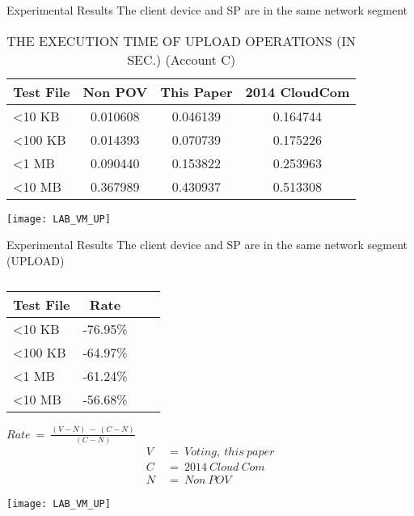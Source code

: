 \begin{frame}{Experimental Results}
{The client device and SP are in the same network segment}
	\scriptsize
    \begin{table}[]
    \centering
    \caption{THE EXECUTION TIME OF \alert{UPLOAD} OPERATIONS (IN SEC.) (Account C)}
    \begin{tabular}{lccc}
        Test File        & Non POV  & This Paper & 2014 CloudCom \\ \hline
        \textless 10 KB  & 0.010608 & 0.046139   & 0.164744      \\ \hline
        \textless 100 KB & 0.014393 & 0.070739   & 0.175226      \\ \hline
        \textless 1 MB   & 0.090440 & 0.153822   & 0.253963      \\ \hline
        \textless 10 MB  & 0.367989 & 0.430937   & 0.513308      \\ \hline
    \end{tabular}
    \end{table}
    \begin{center}
		\texttt{[image: LAB\_VM\_UP]}
    \end{center}
\end{frame}

\begin{frame}{Experimental Results}
{The client device and SP are in the same network segment (UPLOAD)}
	\begin{minipage}[c]{0.4\textwidth}
    \scriptsize
    \begin{table}[] 
    \centering
    \caption{}
    \begin{tabular}{lccc}
        Test File        & Rate     \\ \hline
        \textless 10 KB  & -76.95\% \\ \hline
        \textless 100 KB & -64.97\% \\ \hline
        \textless 1 MB   & -61.24\% \\ \hline
        \textless 10 MB  & -56.68\% \\ \hline
    \end{tabular}
    \end{table}
    \begin{center}
		$Rate\ =\ \frac{(V-N)\ -\ (C-N)}{(C-N)}$
        \begin{equation*} \label{eq3}
                \begin{split}
                        V\ & =\ Voting,\ this\ paper\\
                        C\ & =\ 2014\ Cloud\ Com\\
                        N\ & =\ Non\ POV
                \end{split}
        \end{equation*}
    \end{center}
    \end{minipage}%
    \begin{minipage}[c]{0.6\textwidth}
	\texttt{[image: LAB\_VM\_UP]}
    \end{minipage}
\end{frame}

